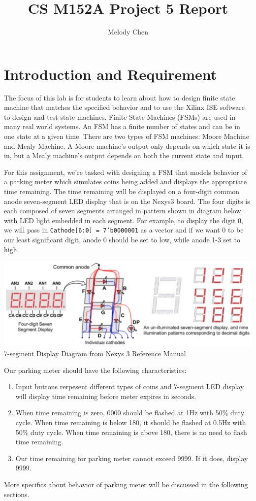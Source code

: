 \documentclass{article}
\title{\vspace{-2.0cm}CS M152A Project 5 Report}
\author{Melody Chen}
\begin{document}
\maketitle
\section{Introduction and Requirement} 
The focus of this lab is for students to learn about how to design finite state machine that matches the specified behavior and to use the Xilinx ISE software to design and test state machines. Finite State Machines (FSMs) are used in many real world systems. An FSM has a finite number of states and can be in one state at a given time. There are two types of FSM machines: Moore Machine and Mealy Machine. A Moore machine's output only depends on which state it is in, but a Mealy machine's output depends on both the current state and input. \par
For this assignment, we're tasked with designing a FSM that models behavior of a parking meter which simulates coins being added and displays the appropriate time remaining. The time remaining will be displayed on a four-digit common anode seven-segment LED display that is on the Nexys3 board. The four digits is each composed of seven segments arranged in pattern shown in diagram below with LED light embedded in each segment. For example, to display the digit 0, we will pass in \texttt{Cathode[6:0] = 7'b0000001} as a vector and if we want 0 to be our least significant digit, anode 0 should be set to low, while anode 1-3 set to high. 
\begin{center}
    \includegraphics[scale=0.4]{7segment.png} \\
    \caption{7-segment Display Diagram from Nexys 3 Reference Manual}
\end{center} 
\noindent Our parking meter should have the following characteristics:
\begin{enumerate}
    \item Input buttons rerpesent different types of coins and 7-segment LED display will display time remaining before meter expires in seconds.
    \item When time remaining is zero, 0000 should be flashed at 1Hz with 50\% duty cycle. When time remaining is below 180, it should be flashed at 0.5Hz with 50\% duty cycle. When time remaining is above 180, there is no need to flash time remaining. 
    \item Our time remaining for parking meter cannot exceed 9999. If it does, display 9999.  
\end{enumerate}
More specifics about behavior of parking meter will be discussed in the following sections.
\end{document}
